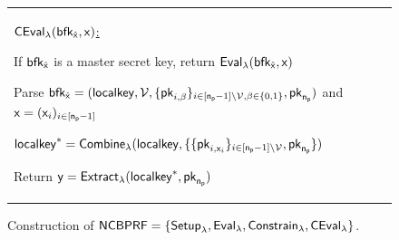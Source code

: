 \begin{figure}[h!]
\begin{center}
{\begin{tabular}{ll}
\begin{minipage}[t]{0.7\textwidth}
	\underline{$\mathsf{CEval}_{\lambda}(\mathsf{bfk}_{\hat{\mathsf{x}}}, \mathsf{x})$:}
	\item If $\mathsf{bfk}_{\hat{\mathsf{x}}}$ is a master secret key, return $\mathsf{Eval}_{\lambda}(\mathsf{bfk}_{\hat{\mathsf{x}}},\mathsf{x})$
	\item Parse $\mathsf{bfk}_{\hat{\mathsf{x}}} = (\mathsf{localkey}, \mathcal{V}, \{\mathsf{pk}_{i,\beta}\}_{i \in [\mathsf{n_p}-1]\backslash\mathcal{V}, \beta \in \{0, 1\}}, \mathsf{pk}_{\mathsf{n_p}})$ and $\mathsf{x} = (\mathsf{x}_i)_{i \in [\mathsf{n_p}-1]}$
	\item $\mathsf{localkey}^* = \mathsf{Combine}_{\lambda}(\mathsf{localkey}, \{\{\mathsf{pk}_{i, \mathsf{x}_i}\}_{i\in[\mathsf{n_p}-1]\backslash\mathcal{V}}, \mathsf{pk}_{\mathsf{n_p}}\})$
	\item Return $\mathsf{y} = \mathsf{Extract}_{\lambda}(\mathsf{localkey}^*, \mathsf{pk}_{\mathsf{n_p}})$
    \end{minipage} 
      \end{tabular}
      }
\end{center}
\caption{Construction of $\mathsf{NCBPRF}=\{\mathsf{Setup}_{\lambda}, \mathsf{Eval}_{\lambda}, \mathsf{Constrain}_{\lambda}, \mathsf{CEval}_{\lambda} \}$.}
\label{fig:con-bprf}
\end{figure}
